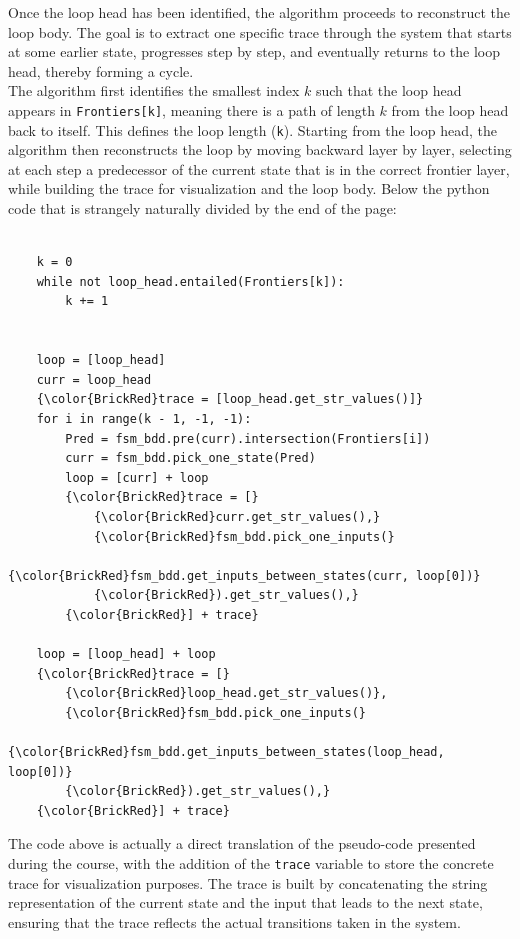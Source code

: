 Once the loop head has been identified, the algorithm proceeds to reconstruct the loop body. The goal is to extract one specific trace through the system that starts at some earlier state, progresses step by step, and eventually returns to the loop head, thereby forming a cycle.\\[2ex]
The algorithm first identifies the smallest index \(k\) such that the loop head appears in \texttt{Frontiers[k]}, meaning there is a path of length \(k\) from the loop head back to itself. This defines the loop length (\texttt{k}). Starting from the loop head, the algorithm then reconstructs the loop by moving backward layer by layer, selecting at each step a predecessor of the current state that is in the correct frontier layer, while building the trace for visualization and the loop body. Below the python code that is strangely naturally divided by the end of the page:
\begin{scriptsize}
\begin{Verbatim}[commandchars=\\\{\}]

    k = 0
    while not loop_head.entailed(Frontiers[k]):
        k += 1
    

    loop = [loop_head]
    curr = loop_head
    {\color{BrickRed}trace = [loop_head.get_str_values()]}
    for i in range(k - 1, -1, -1):
        Pred = fsm_bdd.pre(curr).intersection(Frontiers[i])
        curr = fsm_bdd.pick_one_state(Pred)
        loop = [curr] + loop
        {\color{BrickRed}trace = [}
            {\color{BrickRed}curr.get_str_values(),}
            {\color{BrickRed}fsm_bdd.pick_one_inputs(}
                {\color{BrickRed}fsm_bdd.get_inputs_between_states(curr, loop[0])}
            {\color{BrickRed}).get_str_values(),}
        {\color{BrickRed}] + trace}

    loop = [loop_head] + loop
    {\color{BrickRed}trace = [}
        {\color{BrickRed}loop_head.get_str_values()},
        {\color{BrickRed}fsm_bdd.pick_one_inputs(}
            {\color{BrickRed}fsm_bdd.get_inputs_between_states(loop_head, loop[0])}
        {\color{BrickRed}).get_str_values(),}
    {\color{BrickRed}] + trace}

\end{Verbatim}
\end{scriptsize}
The code above is actually a direct translation of the pseudo-code presented during the course, with the addition of the \texttt{trace} variable to store the concrete trace for visualization purposes. The trace is built by concatenating the string representation of the current state and the input that leads to the next state, ensuring that the trace reflects the actual transitions taken in the system.\\[2ex] 

